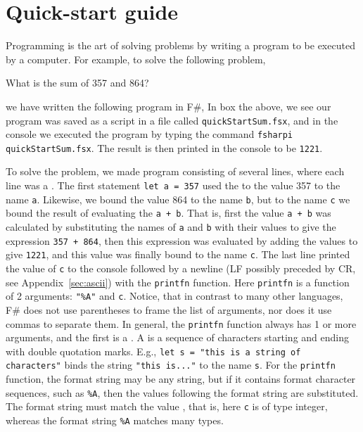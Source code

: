 \chapter{Quick-start guide}
Programming is the art of solving problems by writing a program to be executed by a computer. For example, to solve the following problem,
%
\begin{problem}
  What is the sum of 357 and 864?
\end{problem}
%
we have written the following program in F\#,
%
%
In box the above, we see our program was saved as a script in a file called \texttt{quickStartSum.fsx}, and in the console we executed the program by typing the command \lstinline|fsharpi quickStartSum.fsx|. The result is then printed in the console to be \texttt{1221}.

To solve the problem, we made program consisting of several lines, where each line was a . The first statement \lstinline|let a = 357| used the   to  the value 357 to the name \lstinline|a|. Likewise, we bound the value 864 to the name \lstinline|b|, but to the name \lstinline|c| we bound the result of evaluating the  \lstinline|a + b|. That is, first the value \lstinline|a + b| was calculated by substituting the names of \lstinline|a| and \lstinline|b| with their values to give the expression \lstinline|357 + 864|, then this expression was evaluated by adding the values to give \lstinline|1221|, and this value was finally bound to the name \lstinline|c|. The last line printed the value of \lstinline|c| to the console followed by a newline (LF possibly preceded by CR, see Appendix~\ref{sec:ascii}) with the \lstinline|printfn| function. Here \lstinline|printfn| is a function of 2 arguments: \lstinline|"%A"| %
and \lstinline|c|. Notice, that in contrast to many other languages, F\# does not use parentheses to frame the list of arguments, nor does it use commas to separate them. In general, the \lstinline|printfn| function always has 1 or more arguments, and the first is a . A  is a sequence of characters starting and ending with double quotation marks. E.g., \lstinline|let s = "this is a string of characters"| binds the string \lstinline|"this is..."| to the name \lstinline|s|. For the \lstinline|printfn| function, the format string may be any string, but if it contains format character sequences, such as \lstinline|%A|,
 then the values following the format string are substituted. The format string must match the value , that is, here \lstinline|c| is of type integer, whereas the format string \lstinline|%A| %
matches many types.

